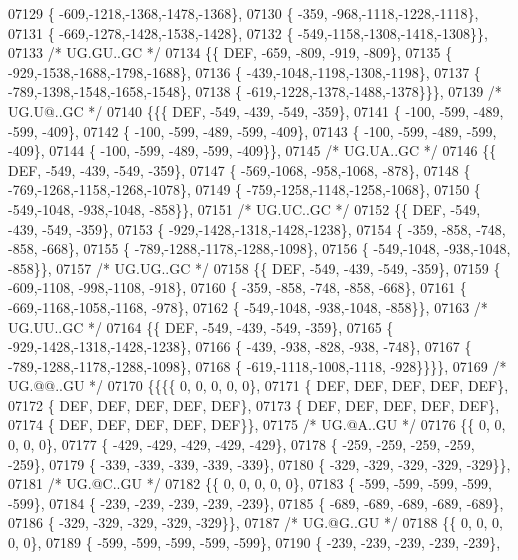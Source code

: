 \begin{DoxyCode}
07129 \{ -609,-1218,-1368,-1478,-1368\},
07130 \{ -359, -968,-1118,-1228,-1118\},
07131 \{ -669,-1278,-1428,-1538,-1428\},
07132 \{ -549,-1158,-1308,-1418,-1308\}\},
07133 \textcolor{comment}{/* UG.GU..GC */}
07134 \{\{  DEF, -659, -809, -919, -809\},
07135 \{ -929,-1538,-1688,-1798,-1688\},
07136 \{ -439,-1048,-1198,-1308,-1198\},
07137 \{ -789,-1398,-1548,-1658,-1548\},
07138 \{ -619,-1228,-1378,-1488,-1378\}\}\},
07139 \textcolor{comment}{/* UG.U@..GC */}
07140 \{\{\{  DEF, -549, -439, -549, -359\},
07141 \{ -100, -599, -489, -599, -409\},
07142 \{ -100, -599, -489, -599, -409\},
07143 \{ -100, -599, -489, -599, -409\},
07144 \{ -100, -599, -489, -599, -409\}\},
07145 \textcolor{comment}{/* UG.UA..GC */}
07146 \{\{  DEF, -549, -439, -549, -359\},
07147 \{ -569,-1068, -958,-1068, -878\},
07148 \{ -769,-1268,-1158,-1268,-1078\},
07149 \{ -759,-1258,-1148,-1258,-1068\},
07150 \{ -549,-1048, -938,-1048, -858\}\},
07151 \textcolor{comment}{/* UG.UC..GC */}
07152 \{\{  DEF, -549, -439, -549, -359\},
07153 \{ -929,-1428,-1318,-1428,-1238\},
07154 \{ -359, -858, -748, -858, -668\},
07155 \{ -789,-1288,-1178,-1288,-1098\},
07156 \{ -549,-1048, -938,-1048, -858\}\},
07157 \textcolor{comment}{/* UG.UG..GC */}
07158 \{\{  DEF, -549, -439, -549, -359\},
07159 \{ -609,-1108, -998,-1108, -918\},
07160 \{ -359, -858, -748, -858, -668\},
07161 \{ -669,-1168,-1058,-1168, -978\},
07162 \{ -549,-1048, -938,-1048, -858\}\},
07163 \textcolor{comment}{/* UG.UU..GC */}
07164 \{\{  DEF, -549, -439, -549, -359\},
07165 \{ -929,-1428,-1318,-1428,-1238\},
07166 \{ -439, -938, -828, -938, -748\},
07167 \{ -789,-1288,-1178,-1288,-1098\},
07168 \{ -619,-1118,-1008,-1118, -928\}\}\}\},
07169 \textcolor{comment}{/* UG.@@..GU */}
07170 \{\{\{\{    0,    0,    0,    0,    0\},
07171 \{  DEF,  DEF,  DEF,  DEF,  DEF\},
07172 \{  DEF,  DEF,  DEF,  DEF,  DEF\},
07173 \{  DEF,  DEF,  DEF,  DEF,  DEF\},
07174 \{  DEF,  DEF,  DEF,  DEF,  DEF\}\},
07175 \textcolor{comment}{/* UG.@A..GU */}
07176 \{\{    0,    0,    0,    0,    0\},
07177 \{ -429, -429, -429, -429, -429\},
07178 \{ -259, -259, -259, -259, -259\},
07179 \{ -339, -339, -339, -339, -339\},
07180 \{ -329, -329, -329, -329, -329\}\},
07181 \textcolor{comment}{/* UG.@C..GU */}
07182 \{\{    0,    0,    0,    0,    0\},
07183 \{ -599, -599, -599, -599, -599\},
07184 \{ -239, -239, -239, -239, -239\},
07185 \{ -689, -689, -689, -689, -689\},
07186 \{ -329, -329, -329, -329, -329\}\},
07187 \textcolor{comment}{/* UG.@G..GU */}
07188 \{\{    0,    0,    0,    0,    0\},
07189 \{ -599, -599, -599, -599, -599\},
07190 \{ -239, -239, -239, -239, -239\},

\end{DoxyCode}
